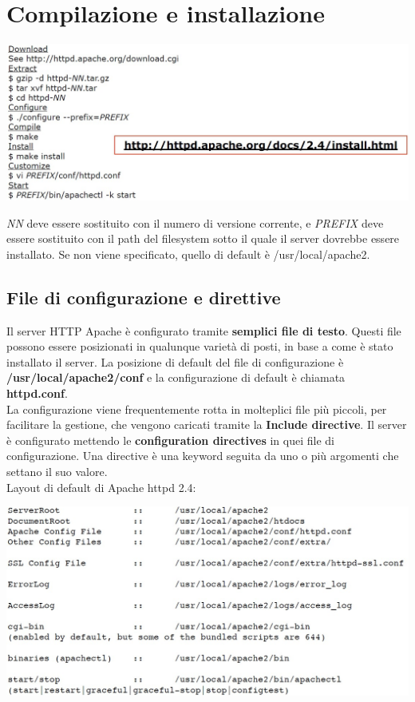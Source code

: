 \section{Compilazione e installazione}
\begin{center}
\includegraphics[scale=0.4]{Images/TecnologieWeb/2/CompilazioneInstallazione.jpg}    
\end{center}

\emph{NN} deve essere sostituito con il numero di versione corrente, e \emph{PREFIX} deve essere sostituito con il path del filesystem sotto il quale il server dovrebbe essere installato. Se non viene specificato, quello di default è /usr/local/apache2.

\subsection{File di configurazione e direttive}
Il server HTTP Apache è configurato tramite \textbf{semplici file di testo}. Questi file possono essere posizionati in qualunque varietà di posti, in base a come è stato installato il server. La posizione di default del file di configurazione è \textbf{/usr/local/apache2/conf} e la configurazione di default è chiamata \textbf{httpd.conf}. \\
La configurazione viene frequentemente rotta in molteplici file più piccoli, per facilitare la gestione, che vengono caricati tramite la \textbf{Include directive}. 
Il server è configurato mettendo le \textbf{configuration directives} in quei file di configurazione. Una directive è una keyword seguita da uno o più argomenti che settano il suo valore. \\

Layout di default di Apache httpd 2.4:
\begin{center}
\includegraphics[scale=0.4]{Images/TecnologieWeb/2/FileConfigurazioneCartelle.jpg}    
\end{center}

